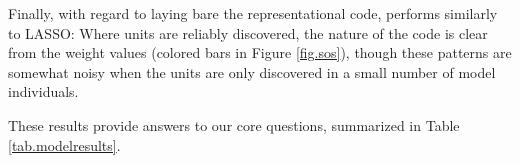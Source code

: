 Finally, with regard to laying bare the representational code, \soslasso performs similarly to LASSO: Where units are reliably discovered, the nature of the code is clear from the weight values (colored bars in Figure \ref{fig.sos}), though these patterns are somewhat noisy when the units are only discovered in a small number of model individuals.

These results provide answers to our core questions, summarized in Table \ref{tab.modelresults}.
%
%
